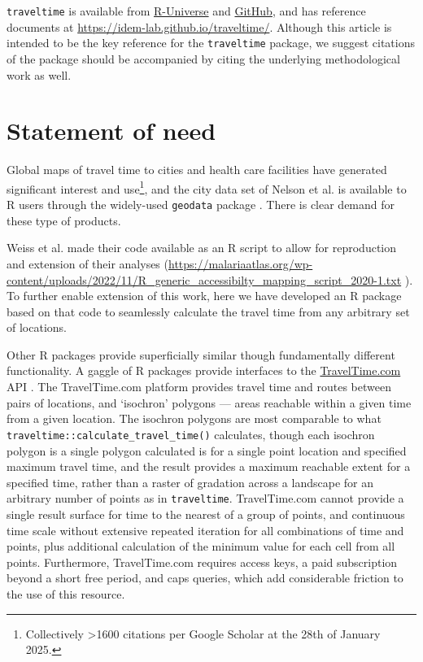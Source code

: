 \documentclass[
  10pt,
  letterpaper,
]{article}
\begin{document}
\texttt{traveltime} is available from
\href{https://idem-lab.r-universe.dev/traveltime}{R-Universe} and
\href{https://github.com/idem-lab/traveltime}{GitHub}, and has reference
documents at \url{https://idem-lab.github.io/traveltime/}. Although this
article is intended to be the key reference for the \texttt{traveltime}
package, we suggest citations of the package should be accompanied by
citing the underlying methodological work
\citep{weiss2018global, weiss2020global} as well.

\section{Statement of need}\label{statement-of-need}

Global maps of travel time to cities
\citep{weiss2018global, nelson2019suite} and health care facilities
\citep{hulland2019travel, weiss2020global} have generated significant
interest and use\footnote{Collectively \textgreater1600 citations per
  Google Scholar at the 28th of January 2025.}, and the city data set of
Nelson et al. \citep{nelson2019suite} is available to R users through the widely-used
\texttt{geodata} package \citep{geodata}. There is clear demand for
these type of products.

Weiss et al. \citep{weiss2020global} made their code available as an R script to
allow for reproduction and extension of their analyses
(\url{https://malariaatlas.org/wp-content/uploads/2022/11/R_generic_accessibilty_mapping_script_2020-1.txt}
). To further enable extension of this work, here we have developed an R
package based on that code to seamlessly calculate the travel time from
any arbitrary set of locations.

Other R packages provide superficially similar though fundamentally
different functionality. A gaggle of R packages provide interfaces to
the \href{https://www.TravelTime.com}{TravelTime.com} API
\citep{traveltimeapi, traveltimeR, rtraveltime, traveltime_gh}. The
TravelTime.com platform provides travel time and routes between pairs of
locations, and `isochron' polygons --- areas reachable within a given
time from a given location. The isochron polygons are most comparable to
what \texttt{traveltime::calculate\_travel\_time()} calculates, though
each isochron polygon is a single polygon calculated is for a single
point location and specified maximum travel time, and the result
provides a maximum reachable extent for a specified time, rather than a
raster of gradation across a landscape for an arbitrary number of points
as in \texttt{traveltime}. TravelTime.com cannot provide a single result
surface for time to the nearest of a group of points, and continuous
time scale without extensive repeated iteration for all combinations of
time and points, plus additional calculation of the minimum value for
each cell from all points. Furthermore, TravelTime.com requires access
keys, a paid subscription beyond a short free period, and caps queries,
which add considerable friction to the use of this resource.
\end{document}
